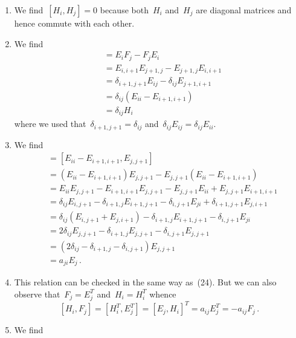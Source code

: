 \begin{enumerate}[label=(\arabic*),start=22]
  \item
    We find~$[H_i, H_j] = 0$ because both~$H_i$ and~$H_j$ are diagonal matrices and hence commute with each other.
  \item
    We find
    \begin{align*}
      [E_i, F_j]
      &=
      E_i F_j - F_j E_i
      \\
      &=
      E_{i,i+1} E_{j+1,j} - E_{j+1,j} E_{i,i+1}
      \\
      &=
      \delta_{i+1,j+1} E_{ij} - \delta_{ij} E_{j+1,i+1}
      \\
      &=
      \delta_{ij} (E_{ii} - E_{i+1,i+1})
      \\
      &=
      \delta_{ij} H_i
    \end{align*}
    where we used that~$\delta_{i+1,j+1} = \delta_{ij}$ and~$\delta_{ij} E_{ij} = \delta_{ij} E_{ii}$.
  \item
    We find
    \begin{align*}
      [H_i, E_j]
      &=
      [E_{ii} - E_{i+1,i+1}, E_{j,j+1}]
      \\
      &=
      (E_{ii} - E_{i+1,i+1}) E_{j,j+1} - E_{j,j+1} (E_{ii} - E_{i+1,i+1})
      \\
      &=
      E_{ii} E_{j,j+1} - E_{i+1,i+1} E_{j,j+1} - E_{j,j+1} E_{ii} + E_{j,j+1} E_{i+1, i+1}
      \\
      &=
      \delta_{ij} E_{i,j+1} - \delta_{i+1,j} E_{i+1,j+1} - \delta_{i,j+1} E_{ji} + \delta_{i+1,j+1} E_{j,i+1}
      \\
      &=
      \delta_{ij} (E_{i,j+1} + E_{j,i+1}) - \delta_{i+1,j} E_{i+1,j+1} - \delta_{i,j+1} E_{ji}
      \\
      &=
      2 \delta_{ij} E_{j,j+1} - \delta_{i+1,j} E_{j,j+1} - \delta_{i,j+1} E_{j,j+1}
      \\
      &=
      (2 \delta_{ij} - \delta_{i+1,j} - \delta_{i,j+1}) E_{j,j+1}
      \\
      &=
      a_{ji} E_j  \,.
    \end{align*}
  \item
    This relation can be checked in the same way as~(24).
    But we can also observe that~$F_j = E_j^T$ and~$H_i = H_i^T$ whence
    \[
      [H_i, F_j]
      =
      [H_i^T, E_j^T]
      =
      [E_j, H_i]^T
      =
      a_{ij} E_j^T
      =
      -a_{ij} F_j \,.
    \]
  \item
    We find
    \begin{align*}

\end{align*}
\end{enumerate}
